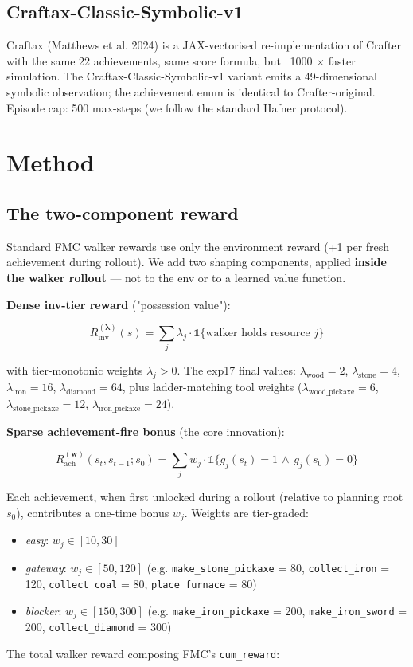 \documentclass[11pt,letterpaper]{article}
\begin{document}
\subsection{Craftax-Classic-Symbolic-v1}

Craftax (Matthews et al. 2024) is a JAX-vectorised re-implementation
of Crafter with the same 22 achievements, same score formula, but
~1000 × faster simulation. The Craftax-Classic-Symbolic-v1 variant
emits a 49-dimensional symbolic observation; the achievement enum is
identical to Crafter-original. Episode cap: 500 max-steps (we follow
the standard Hafner protocol).



\section{Method}

\subsection{The two-component reward}

Standard FMC walker rewards use only the environment reward (+1 per
fresh achievement during rollout). We add two shaping components,
applied \textbf{inside the walker rollout} — not to the env or to a learned
value function.

\textbf{Dense inv-tier reward} ("possession value"):

\[
R_{\text{inv}}^{(\boldsymbol\lambda)}(s) = \sum_{j} \lambda_j \cdot \mathbb{1}\{\text{walker holds resource } j\}
\]

with tier-monotonic weights $\lambda_j > 0$. The exp17 final values:
$\lambda_{\text{wood}} = 2$, $\lambda_{\text{stone}} = 4$,
$\lambda_{\text{iron}} = 16$, $\lambda_{\text{diamond}} = 64$, plus
ladder-matching tool weights ($\lambda_{\text{wood\_pickaxe}} = 6$,
$\lambda_{\text{stone\_pickaxe}} = 12$,
$\lambda_{\text{iron\_pickaxe}} = 24$).

\textbf{Sparse achievement-fire bonus} (the core innovation):

\[
R_{\text{ach}}^{(\mathbf{w})}(s_t, s_{t-1}; s_0) = \sum_j w_j \cdot \mathbb{1}\{g_j(s_t) = 1 \,\wedge\, g_j(s_0) = 0\}
\]

Each achievement, when first unlocked during a rollout (relative to
planning root $s_0$), contributes a one-time bonus $w_j$. Weights are
tier-graded:

\begin{itemize}
\item \emph{easy}: $w_j \in [10, 30]$
\item \emph{gateway}: $w_j \in [50, 120]$ (e.g. \texttt{make\_stone\_pickaxe} = 80, \texttt{collect\_iron} = 120, \texttt{collect\_coal} = 80, \texttt{place\_furnace} = 80)
\item \emph{blocker}: $w_j \in [150, 300]$ (e.g. \texttt{make\_iron\_pickaxe} = 200, \texttt{make\_iron\_sword} = 200, \texttt{collect\_diamond} = 300)
\end{itemize}
The total walker reward composing FMC's \texttt{cum\_reward}:
\end{document}
